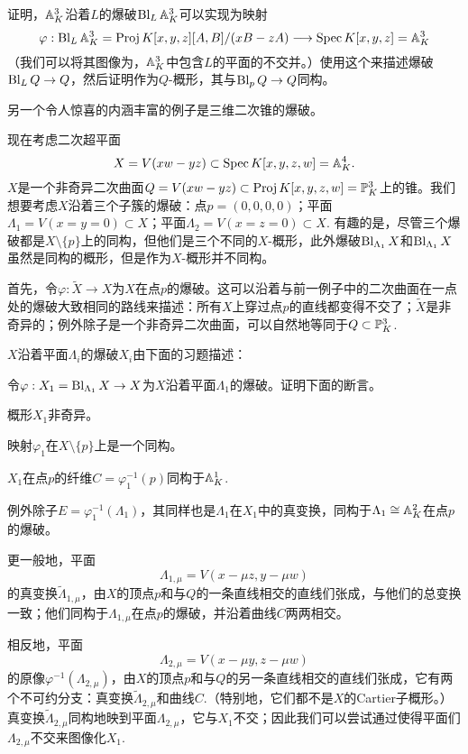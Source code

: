 \begin{exe}\label{exe:4.28}
	证明，$\mathbb{A}^3_K$沿着$L$的爆破$\operatorname{Bl}_L\mathbb{A}_K^3$可以实现为映射
	\[
		\varphi:\operatorname{Bl}_L \mathbb A_K^3=\operatorname{Proj} K[x,y,z][A,B]/(xB-zA)\longrightarrow \operatorname{Spec} K[x,y,z]=\mathbb A_K^3
	\]
	（我们可以将其图像为，$\mathbb{A}_K^3$中包含$L$的平面的不交并。）使用这个来描述爆破$\operatorname{Bl}_L Q\to Q$，然后证明作为$Q$-概形，其与$\operatorname{Bl}_p Q\to Q$同构。
\end{exe}

另一个令人惊喜的内涵丰富的例子是三维二次锥的爆破。

\begin{exa}\label{exa:4.29}
	现在考虑二次超平面
	\[
	X=V(xw-yz)\subset \operatorname{Spec} K[x,y,z,w]=\mathbb A_K^4.
	\]
	$X$是一个非奇异二次曲面$Q=V(xw-yz)\subset \operatorname{Proj} K[x,y,z,w]=\mathbb{P}_K^3$上的锥。我们想要考虑$X$沿着三个子簇的爆破：点$p=(0,0,0,0)$；平面$\Lambda_1=V(x=y=0)\subset X$；平面$\Lambda_2=V(x=z=0)\subset X$. 有趣的是，尽管三个爆破都是$X\setminus \{p\}$上的同构，但他们是三个不同的$X$-概形，此外爆破$\operatorname{Bl}_{\Lambda_1}X$和$\operatorname{Bl}_{\Lambda_1}X$虽然是同构的概形，但是作为$X$-概形并不同构。
\end{exa}

首先，令$\varphi:\tilde X\to X$为$X$在点$p$的爆破。这可以沿着与前一例子中的二次曲面在一点处的爆破大致相同的路线来描述：所有$X$上穿过点$p$的直线都变得不交了；$\tilde X$是非奇异的；例外除子是一个非奇异二次曲面，可以自然地等同于$Q\subset \mathbb{P}_K^3$.

$X$沿着平面$\Lambda_i$的爆破$X_i$由下面的习题描述：

\begin{exe}\label{exe:4.30}
	令$\varphi:X_1=\operatorname{Bl}_{\Lambda_1}X\to X$为$X$沿着平面$\Lambda_1$的爆破。证明下面的断言。
	\begin{compactenum}[(a)]
		\item 概形$X_1$非奇异。
		\item 映射$\varphi_1$在$X\setminus \{p\}$上是一个同构。
		\item $X_1$在点$p$的纤维$C=\varphi_1^{-1}(p)$同构于$\mathbb{A}_K^1$.
		\item 例外除子$E=\varphi_1^{-1}(\Lambda_1)$，其同样也是$\Lambda_1$在$X_1$中的真变换，同构于$\Lambda_1\cong \mathbb{A}_K^2$在点$p$的爆破。
		\item 更一般地，平面
			\[
				\Lambda_{1,\mu}=V(x-\mu z,y-\mu w)
			\]
			的真变换$\tilde \Lambda_{1,\mu}$，由$X$的顶点$p$和与$Q$的一条直线相交的直线们张成，与他们的总变换一致；他们同构于$\Lambda_{1,\mu}$在点$p$的爆破，并沿着曲线$C$两两相交。\nottran
		\item 相反地，平面
			\[
				\Lambda_{2,\mu}=V(x-\mu y,z-\mu w)
			\]
			的原像$\varphi^{-1}(\Lambda_{2,\mu})$，由$X$的顶点$p$和与$Q$的另一条直线相交的直线们张成，它有两个不可约分支：真变换$\tilde \Lambda_{2,\mu}$和曲线$C$.（特别地，它们都不是$X$的Cartier子概形。）真变换$\tilde \Lambda_{2,\mu}$同构地映到平面$\Lambda_{2,\mu}$，它与$X_1$不交；因此我们可以尝试通过使得平面们$\Lambda_{2,\mu}$不交来图像化$X_1$. \nottran

	\end{compactenum}
\end{exe}

